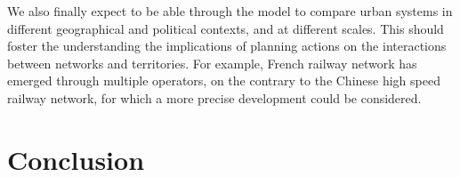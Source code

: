 We also finally expect to be able through the model to compare urban systems in different geographical and political contexts, and at different scales. This should foster the understanding the implications of planning actions on the interactions between networks and territories. For example, French railway network has emerged through multiple operators, on the contrary to the Chinese high speed railway network, for which a more precise development could be considered.



\section*{Conclusion}














%
%

